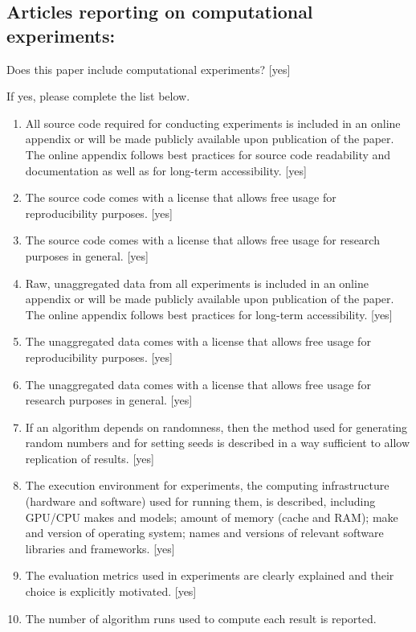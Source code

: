 \documentclass[review]{jair}
\begin{document}
\subsection*{Articles reporting on computational experiments:}
Does this paper include computational experiments? [yes]

If yes, please complete the list below.
\begin{enumerate}
    \item 
    All source code required for conducting experiments is included in an online appendix 
    or will be made publicly available upon publication of the paper.
    The online appendix follows best practices for source code readability and documentation as well as for long-term accessibility.
    [yes]
    \item The source code comes with a license that
    allows free usage for reproducibility purposes.
    [yes]
    \item The source code comes with a license that
    allows free usage for research purposes in general.
    [yes]
    \item 
    Raw, unaggregated data from all experiments is included in an online appendix 
    or will be made publicly available upon publication of the paper.
    The online appendix follows best practices for long-term accessibility.
    [yes]
    \item The unaggregated data comes with a license that
    allows free usage for reproducibility purposes.
    [yes]
    \item The unaggregated data comes with a license that
    allows free usage for research purposes in general.
    [yes]
    \item If an algorithm depends on randomness, then the method used for generating random numbers and for setting seeds is described in a way sufficient to allow replication of results. 
    [yes]
    \item The execution environment for experiments, the computing infrastructure (hardware and software) used for running them, is described, including GPU/CPU makes and models; amount of memory (cache and RAM); make and version of operating system; names and versions of relevant software libraries and frameworks. 
    [yes]
    \item 
    The evaluation metrics used in experiments are clearly explained and their choice is explicitly motivated. 
    [yes]
    \item 
    The number of algorithm runs used to compute each result is reported. 

\end{enumerate}
\end{document}
